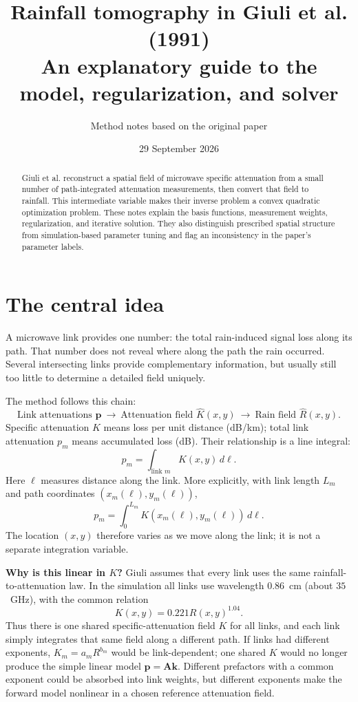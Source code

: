\documentclass[11pt,a4paper]{article}
\title{Rainfall tomography in Giuli et al. (1991)\\\large An explanatory guide to the model, regularization, and solver}
\author{Method notes based on the original paper}
\date{29 September 2026}
\newcommand{\vect}[1]{\mathbf{#1}}
\begin{document}
\maketitle
\begin{abstract}
Giuli et al. reconstruct a spatial field of microwave specific attenuation from a small number of path-integrated attenuation measurements, then convert that field to rainfall. This intermediate variable makes their inverse problem a convex quadratic optimization problem. These notes explain the basis functions, measurement weights, regularization, and iterative solution. They also distinguish prescribed spatial structure from simulation-based parameter tuning and flag an inconsistency in the paper's parameter labels.
\end{abstract}
\section{The central idea}
A microwave link provides one number: the total rain-induced signal loss along its path. That number does not reveal where along the path the rain occurred. Several intersecting links provide complementary information, but usually still too little to determine a detailed field uniquely.

The method follows this chain:
\[
\boxed{\text{Link attenuations }\vect p}
\ \longrightarrow\ 
\boxed{\text{Attenuation field }\widehat K(x,y)}
\ \longrightarrow\ 
\boxed{\text{Rain field }\widehat R(x,y)}.
\]
Specific attenuation $K$ means loss per unit distance (dB/km); total link attenuation $p_m$ means accumulated loss (dB). Their relationship is a line integral:
\begin{equation}
p_m=\int_{\text{link }m}K(x,y)\,d\ell.
\end{equation}
Here $\ell$ measures distance along the link. More explicitly, with link length $L_m$ and path coordinates $(x_m(\ell),y_m(\ell))$,
\[
p_m=\int_0^{L_m}K(x_m(\ell),y_m(\ell))\,d\ell.
\]
The location $(x,y)$ therefore varies as we move along the link; it is not a separate integration variable.

\textbf{Why is this linear in $K$?} Giuli assumes that every link uses the same
rainfall-to-attenuation law. In the simulation all links use wavelength
$0.86$~cm (about $35$~GHz), with the common relation
\[
K(x,y)=0.221R(x,y)^{1.04}.
\]
Thus there is one shared specific-attenuation field $K$ for all links, and
each link simply integrates that same field along a different path. If links
had different exponents, $K_m=a_mR^{b_m}$ would be link-dependent; one shared
$K$ would no longer produce the simple linear model $\vect p=\vect A\vect k$.
Different prefactors with a common exponent could be absorbed into link
weights, but different exponents make the forward model nonlinear in a chosen
reference attenuation field.
\end{document}
